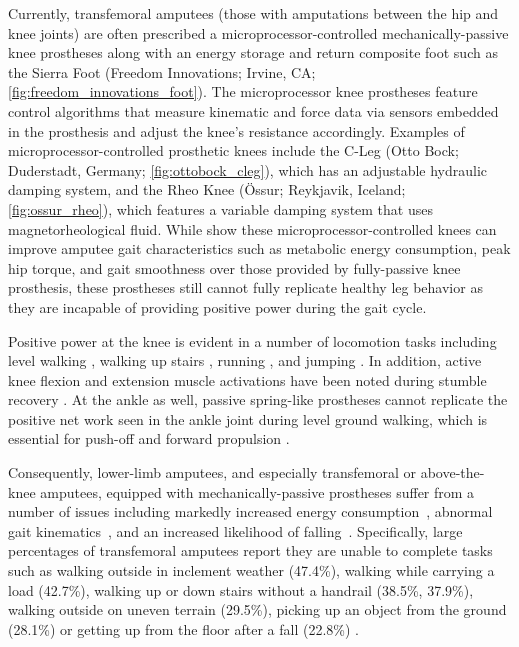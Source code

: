 Currently, transfemoral amputees (those with amputations between the hip and
knee joints) are often prescribed a microprocessor-controlled
mechanically-passive knee prostheses along with an energy storage and return
composite foot such as the Sierra Foot (Freedom Innovations;
Irvine, CA; \cref{fig:freedom_innovations_foot}). The microprocessor knee
prostheses feature control algorithms that measure kinematic and force data via
sensors embedded in the prosthesis and adjust the knee's resistance accordingly.
Examples of microprocessor-controlled prosthetic knees include the C-Leg (Otto
Bock; Duderstadt, Germany; \cref{fig:ottobock_cleg}), which has an adjustable
hydraulic damping system, and the Rheo Knee (Össur; Reykjavik, Iceland;
\cref{fig:ossur_rheo}), which features a variable damping system that uses
magnetorheological fluid. While \citet{johansson2005clinical} show these
microprocessor-controlled knees can improve amputee gait characteristics such as
metabolic energy consumption, peak hip torque, and gait smoothness over those
provided by fully-passive knee prosthesis, these prostheses still cannot fully
replicate healthy leg behavior as they are incapable of providing positive power
during the gait cycle. 

Positive power at the knee is evident in a number of locomotion tasks including
level walking \citep{perry1992gait}, walking up stairs
\citep{nadeau2003frontal}, running \citep{buczek1990stance}, and jumping
\citep{hubley1983work}. In addition, active knee flexion and extension muscle
activations have been noted during stumble recovery \citep{eng1994strategies}.
At the ankle as well, passive spring-like prostheses cannot replicate the
positive net work seen in the ankle joint during level ground walking, which is
essential for push-off and forward propulsion \citep{perry1992gait}.

Consequently, lower-limb amputees, and especially transfemoral or above-the-knee
amputees, equipped with mechanically-passive prostheses suffer from a number of
issues including markedly increased energy consumption~\citep{waters1976energy},
abnormal gait kinematics~\citep{jaegers1995prosthetic}, and an increased
likelihood of falling~\citep{miller2001prevalence}. Specifically, large
percentages of transfemoral amputees report they are unable to complete tasks
such as walking outside in inclement weather (47.4\%), walking while carrying a
load (42.7\%), walking up or down stairs without a handrail (38.5\%, 37.9\%),
walking outside on uneven terrain (29.5\%), picking up an object from the ground
(28.1\%) or getting up from the floor after a fall (22.8\%)
\citep{gauthier1999enabling}.


